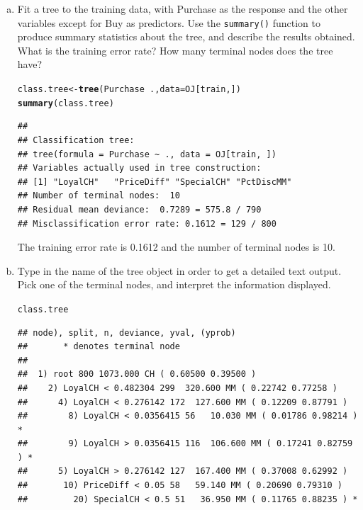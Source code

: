 \documentclass[12pt,fleqn]{article}\usepackage[]{graphicx}\usepackage[]{color}
\makeatletter
\newcommand{\hlopt}[1]{\textcolor[rgb]{0,0,0}{#1}}%
\newcommand{\hlstd}[1]{\textcolor[rgb]{0.345,0.345,0.345}{#1}}%
\newcommand{\hlkwb}[1]{\textcolor[rgb]{0.69,0.353,0.396}{#1}}%
\newcommand{\hlkwc}[1]{\textcolor[rgb]{0.333,0.667,0.333}{#1}}%
\newcommand{\hlkwd}[1]{\textcolor[rgb]{0.737,0.353,0.396}{\textbf{#1}}}%
\newenvironment{kframe}{%
 \def\at@end@of@kframe{}%
 \ifinner\ifhmode%
  \def\at@end@of@kframe{\end{minipage}}%
  \begin{minipage}{\columnwidth}%
 \fi\fi%
 \def\FrameCommand##1{\hskip\@totalleftmargin \hskip-\fboxsep
 \colorbox{shadecolor}{##1}\hskip-\fboxsep
     \hskip-\linewidth \hskip-\@totalleftmargin \hskip\columnwidth}%
 \MakeFramed {\advance\hsize-\width
   \@totalleftmargin\z@ \linewidth\hsize
   \@setminipage}}%
 {\par\unskip\endMakeFramed%
 \at@end@of@kframe}
\newenvironment{knitrout}{}{} %
\theoremstyle{definition}
\makeatother
\begin{document}
\begin{enumerate}[1.]
\begin{enumerate}[(a)]
        \item Fit a tree to the training data, with Purchase as the response and the other variables except for Buy as predictors. Use the \texttt{summary()} function to produce summary statistics about the tree, and describe the results obtained. What is the training error rate? How many terminal nodes does the tree have?

\begin{knitrout}
\color{fgcolor}\begin{kframe}
\begin{alltt}
\hlstd{class.tree} \hlkwb{<-} \hlkwd{tree}\hlstd{(Purchase} \hlopt{~} \hlstd{.,} \hlkwc{data} \hlstd{= OJ[train,])}
\hlkwd{summary}\hlstd{(class.tree)}
\end{alltt}
\begin{verbatim}
## 
## Classification tree:
## tree(formula = Purchase ~ ., data = OJ[train, ])
## Variables actually used in tree construction:
## [1] "LoyalCH"   "PriceDiff" "SpecialCH" "PctDiscMM"
## Number of terminal nodes:  10 
## Residual mean deviance:  0.7289 = 575.8 / 790 
## Misclassification error rate: 0.1612 = 129 / 800
\end{verbatim}
\end{kframe}
\end{knitrout}
        The training error rate is 0.1612 and the number of terminal nodes is 10.
        \item Type in the name of the tree object in order to get a detailed text output. Pick one of the terminal nodes, and interpret the information displayed.
\begin{knitrout}
\color{fgcolor}\begin{kframe}
\begin{alltt}
\hlstd{class.tree}
\end{alltt}
\begin{verbatim}
## node), split, n, deviance, yval, (yprob)
##       * denotes terminal node
## 
##  1) root 800 1073.000 CH ( 0.60500 0.39500 )  
##    2) LoyalCH < 0.482304 299  320.600 MM ( 0.22742 0.77258 )  
##      4) LoyalCH < 0.276142 172  127.600 MM ( 0.12209 0.87791 )  
##        8) LoyalCH < 0.0356415 56   10.030 MM ( 0.01786 0.98214 ) *
##        9) LoyalCH > 0.0356415 116  106.600 MM ( 0.17241 0.82759 ) *
##      5) LoyalCH > 0.276142 127  167.400 MM ( 0.37008 0.62992 )  
##       10) PriceDiff < 0.05 58   59.140 MM ( 0.20690 0.79310 )  
##         20) SpecialCH < 0.5 51   36.950 MM ( 0.11765 0.88235 ) *

\end{verbatim}
\end{kframe}
\end{knitrout}
\end{enumerate}
\end{enumerate}
\end{document}

